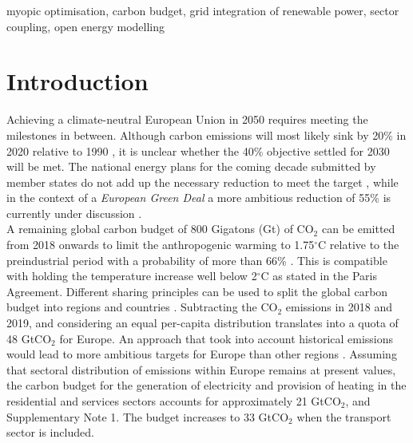 \documentclass[5p]{elsarticle} %
\begin{document}
\begin{frontmatter}
\begin{abstract}
\end{abstract}

\begin{keyword}
myopic optimisation, carbon budget, grid integration of renewable power, sector coupling, open energy modelling
\end{keyword}

\end{frontmatter}

\linenumbers

\section{Introduction}

Achieving a climate-neutral European Union in 2050 \cite{in-depth_2018} requires meeting the milestones in between. Although carbon emissions will most likely sink by 20\% in 2020 relative to 1990 \cite{EEA_totalGHG}, it is unclear whether the 40\% objective settled for 2030 will be met. The national energy plans for the coming decade submitted by member states do not add up the necessary reduction to meet the target \cite{EU-appraisal_2019}, while in the context of a \textit{European Green Deal} a more ambitious reduction of 55\% is currently under discussion \cite{GreenDeal}. \\ %

A remaining global carbon budget of 800 Gigatons (Gt) of CO$_2$ can be emitted from 2018 onwards to limit the anthropogenic warming to 1.75$^{\circ}$C relative to the preindustrial period with a probability of more than 66\% \cite{IPCC_1.5}. This is compatible with holding the temperature increase well below 2$^{\circ}$C as stated in the Paris Agreement. Different sharing principles can be used to split the global carbon budget into regions and countries \cite{Raupach_2014}. Subtracting the CO$_2$ emissions in 2018 and 2019, and considering an equal per-capita distribution translates into a quota of 48 GtCO$_2$ for Europe. An approach that took into account historical emissions would lead to more ambitious targets for Europe than other regions \cite{Matthews_2016}. Assuming that sectoral distribution of emissions within Europe remains at present values, the carbon budget for the generation of electricity and provision of heating in the residential and services sectors accounts for approximately 21 GtCO$_2$, \cite{UNFCCC_inventory} and Supplementary Note 1. The budget increases to 33 GtCO$_2$ when the transport sector is included. \\ 
\end{document}
